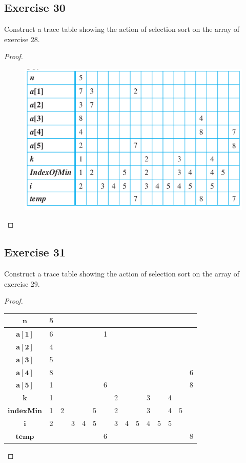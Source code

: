 \documentclass[14pt]{extarticle}
\begin{document}
\subsection{Exercise 30}
Construct a trace table showing the action of selection sort on the array of exercise 28.

\begin{proof}
\begin{figure}[ht!]
\centering
\includegraphics[scale=0.6]{../images/11.3.30.png}
\end{figure}
\end{proof}

\subsection{Exercise 31}
Construct a trace table showing the action of selection sort on the array of exercise 29.

\begin{proof}
\begin{center}
\begin{tabular}{|c|c|c|c|c|c|c|c|c|c|c|c|c|c|c|}
\hline
\(\bm{n}\)        &5& & & & & & & & & & & & & \\
\hline
\(\bm{a[1]}\)     &6& & & & &1& & & & & & & & \\
\hline
\(\bm{a[2]}\)     &4& & & & & & & & & & & & & \\
\hline
\(\bm{a[3]}\)     &5& & & & & & & & & & & & & \\
\hline
\(\bm{a[4]}\)     &8& & & & & & & & & & & & &6 \\
\hline
\(\bm{a[5]}\)     &1& & & & &6& & & & & & & &8 \\
\hline
\(\bm{k}\)        &1& & & & & &2& & &3& &4& & \\
\hline
\(\bm{indexMin}\) &1&2& & &5& &2& & &3& &4&5& \\
\hline
\(\bm{i}\)        &2& &3&4&5& &3&4&5&4&5&5& & \\
\hline
\(\bm{temp}\)     & & & & & &6& & & & & & & &8 \\
\hline
\end{tabular}
\end{center}
\end{proof}
\end{document}

